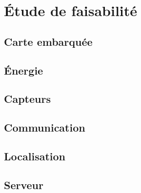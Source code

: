 \section{Étude de faisabilité}

\subsection{Carte embarquée}

\subsection{Énergie}

\subsection{Capteurs}

\subsection{Communication}

\subsection{Localisation}

\subsection{Serveur}
\vfill
\pagebreak
